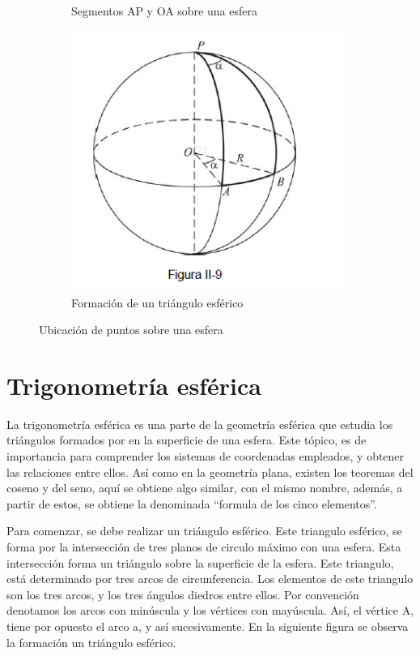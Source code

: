 \begin{figure}[ht]
\begin{subfigure}[t]{0.3\textwidth}
		\caption{Segmentos AP y OA sobre una esfera}	
		\label{fig:seg_ap_oa}	
	\end{subfigure}
	\hfill
	\begin{subfigure}[t]{0.3\textwidth}
		\includegraphics[trim={0 1.2cm 0 0},clip=true,width=1.3\textwidth]{segmento_ap3} 
		\caption{Formación de un triángulo esférico}		
		\label{fig:triang_esfer_form}
	\end{subfigure}
	
	\caption{Ubicación de puntos sobre una esfera}
\end{figure}

\section{Trigonometría esférica} 

La trigonometría esférica es una parte de la geometría esférica que estudia los triángulos formados por en la superficie de una esfera. Este tópico, es de importancia para comprender los sistemas de coordenadas empleados, y obtener las relaciones entre ellos. Así como en la geometría plana, existen los teoremas del coseno y del seno, aquí se obtiene algo similar, con el mismo nombre, además, a partir de estos, se obtiene la denominada ``formula de los cinco elementos''. 


Para comenzar, se debe realizar un triángulo esférico. Este triangulo esférico, se forma por la intersección de tres planos de circulo máximo con una esfera. Esta intersección forma un triángulo sobre la superficie de la esfera. Este triangulo, está determinado por tres arcos de circunferencia. Los elementos de este triangulo son los tres arcos, y los tres ángulos diedros entre ellos. Por convención denotamos los arcos con minúscula y los vértices con mayúscula. Así, el vértice A, tiene por opuesto el arco a, y así sucesivamente. En la siguiente figura se observa la formación un triángulo esférico. 

